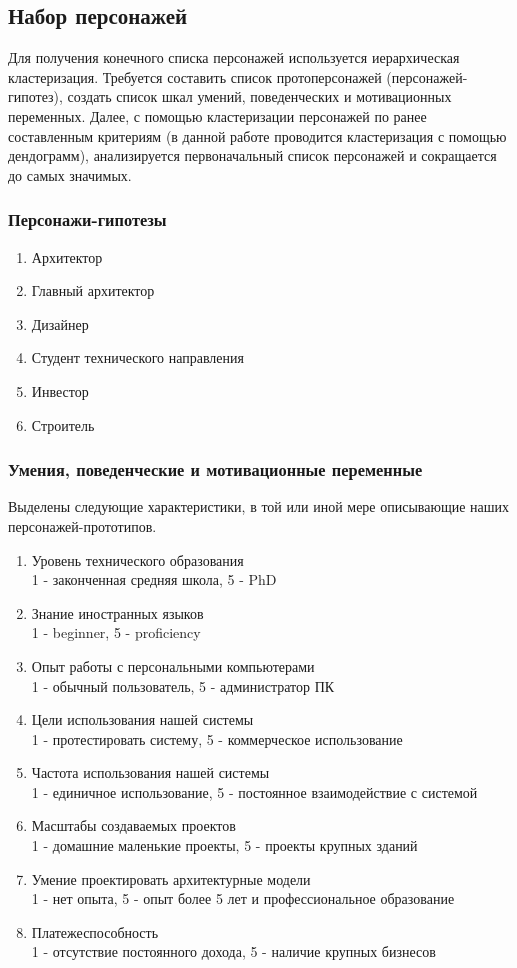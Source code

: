 \documentclass[a4paper,14pt]{extreport} %
\begin{document}
\subsection{Набор персонажей}

Для получения конечного списка персонажей используется иерархическая кластеризация. Требуется составить список протоперсонажей (персонажей-гипотез), создать список шкал умений, поведенческих и мотивационных переменных. Далее, с помощью кластеризации персонажей по ранее составленным критериям (в данной работе проводится кластеризация с помощью дендограмм), анализируется первоначальный список персонажей и сокращается до самых значимых.

\subsubsection{Персонажи-гипотезы}
\begin{enumerate}
\item Архитектор
\item Главный архитектор
\item Дизайнер
\item Студент технического направления
\item Инвестор
\item Строитель
\end {enumerate}

\subsubsection{Умения, поведенческие и мотивационные переменные}

Выделены следующие характеристики, в той или иной мере описывающие наших персонажей-прототипов.
\begin{enumerate}
\item Уровень технического образования \\
1 - законченная средняя школа, 5 - PhD
\item Знание иностранных языков \\
1 - beginner, 5 - proficiency
\item Опыт работы с персональными компьютерами \\
1 - обычный пользователь, 5 - администратор ПК
\item Цели использования нашей системы \\
1 - протестировать систему, 5 - коммерческое использование
\item Частота использования нашей системы \\
1 - единичное использование, 5 - постоянное взаимодействие с системой
\item Масштабы создаваемых проектов \\
1 - домашние маленькие проекты, 5 - проекты крупных зданий
\item Умение проектировать архитектурные модели \\
1 - нет опыта, 5 - опыт более 5 лет и профессиональное образование
\item Платежеспособность \\
1 - отсутствие постоянного дохода, 5 - наличие крупных бизнесов
\end{enumerate}
\end{document}
